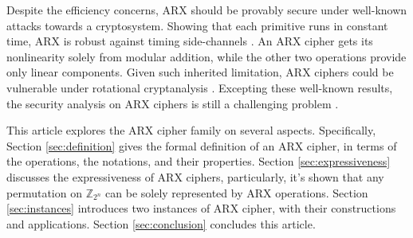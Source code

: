 Despite the efficiency concerns, ARX should be provably secure under well-known attacks
towards a cryptosystem. Showing that each primitive runs in constant time, ARX is robust
against timing side-channels \cite{beaulieu2015simon}. An ARX cipher gets its
nonlinearity solely from modular addition, while the other two operations provide only
linear components. Given such inherited limitation, ARX ciphers could be vulnerable
under rotational cryptanalysis \cite{khovratovich2010rotational}. Excepting these
well-known results, the security analysis on ARX ciphers is still a challenging problem
\cite{mouha2011arx}.

This article explores the ARX cipher family on several aspects. Specifically, Section
\ref{sec:definition} gives the formal definition of an ARX cipher, in terms of the
operations, the notations, and their properties. Section \ref{sec:expressiveness}
discusses the expressiveness of ARX ciphers, particularly, it's shown that any permutation
on $\mathbb{Z}_{2^n}$ can be solely represented by ARX operations. Section \ref{sec:instances}
introduces two instances of ARX cipher, with their constructions and applications.
Section \ref{sec:conclusion} concludes this article.
